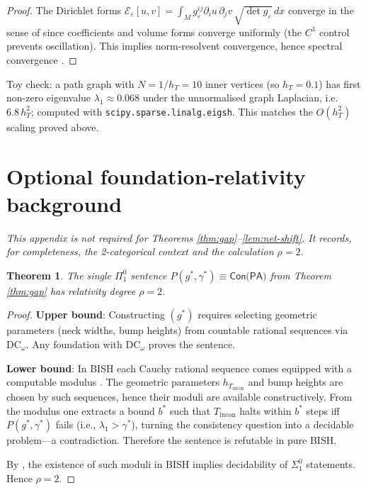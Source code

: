 \documentclass[11pt]{article}
\newtheorem{theorem}{Theorem}[section]
\theoremstyle{definition}\newtheorem{definition}[theorem]{Definition}
\theoremstyle{remark}\newtheorem{remark}[theorem]{Remark}
\newcommand{\DCw}{\mathrm{DC}_{\omega}}
\newcommand{\Tincon}{T_{\mathrm{incon}}}      %
\begin{document}
\begin{proof}
The Dirichlet forms $\mathcal{E}_\varepsilon[u,v] = \int_M g_\varepsilon^{ij} \partial_i u \, \partial_j v \, \sqrt{\det g_\varepsilon} \, dx$ converge in the sense of \cite[VI.3.9, VI.7]{Kato1995} since coefficients and volume forms converge uniformly (the $C^1$ control prevents oscillation). This implies norm-resolvent convergence, hence spectral convergence \cite[VIII.23]{ReedSimon1978}.
\end{proof}

Toy check: a path graph with $N=1/h_T=10$ inner vertices
(so $h_T=0.1$) has first non-zero eigenvalue $\lambda_{1}\approx0.068$
under the unnormalised graph Laplacian, i.e.\ $6.8\,h_T^{2}$; computed
with \texttt{scipy.sparse.linalg.eigsh}.  This matches the $O(h_T^{2})$
scaling proved above.

\section{Optional foundation‑relativity background}\label{app:relativity}
\emph{This appendix is not required for Theorems
\ref{thm:gap}--\ref{lem:net-shift}.  It records, for completeness, the
2‑categorical context and the calculation $\rho=2$.}

\begin{theorem}\label{thm:rho}
The single $\Pi^0_1$ sentence $P(g^\ast,\gamma^\ast)\equiv\textsf{Con(PA)}$ from Theorem \ref{thm:gap} has relativity degree $\rho=2$.
\end{theorem}

\begin{proof}
\textbf{Upper bound}: Constructing $(g^\ast)$ requires selecting geometric parameters (neck widths, bump heights) from countable rational sequences via $\DCw$. Any foundation with $\DCw$ proves the sentence.

\textbf{Lower bound}: In BISH each Cauchy rational sequence comes equipped with a computable modulus \cite[§2.7]{BishopBridges1985}. The geometric parameters $h_{\Tincon}$ and bump heights are chosen by such sequences, hence their moduli are available constructively. From the modulus one extracts a bound $b^\ast$ such that $\Tincon$ halts within $b^\ast$ steps iff $P(g^\ast,\gamma^\ast)$ fails (i.e., $\lambda_1 > \gamma^\ast$), turning the consistency question into a decidable problem—a contradiction. Therefore the sentence is refutable in pure BISH.

By \cite{Ishihara2006}, the existence of such moduli in BISH implies decidability of $\Sigma^0_1$ statements. Hence $\rho=2$.
\end{proof}
\end{document}
